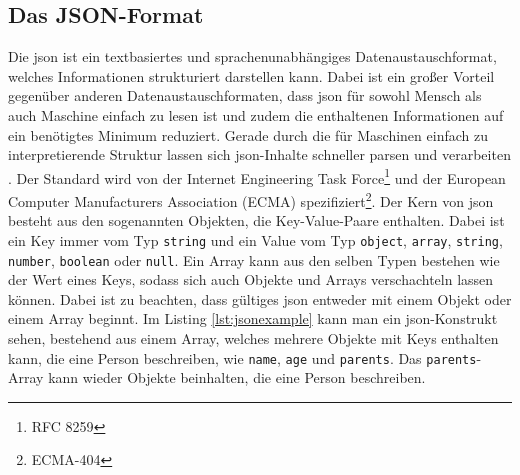 \subsection{Das JSON-Format}
Die \ac{json} ist ein textbasiertes und sprachenunabhängiges Datenaustauschformat, welches Informationen strukturiert darstellen kann.
Dabei ist ein großer Vorteil gegenüber anderen Datenaustauschformaten, dass \ac{json} für sowohl Mensch als auch Maschine einfach zu lesen ist und zudem die enthaltenen Informationen auf ein benötigtes Minimum reduziert.
Gerade durch die für Maschinen einfach zu interpretierende Struktur lassen sich \ac{json}-Inhalte schneller parsen und verarbeiten \parencite{WYS2014}.
Der Standard wird von der Internet Engineering Task Force\footnote{RFC 8259} und der European Computer Manufacturers Association (ECMA) spezifiziert\footnote{ECMA-404}.\pbreak%
%
Der Kern von \ac{json} besteht aus den sogenannten Objekten, die Key-Value-Paare enthalten.
Dabei ist ein Key immer vom Typ \texttt{string} und ein Value vom Typ \texttt{object}, \texttt{array}, \texttt{string}, \texttt{number}, \texttt{boolean} oder \texttt{null}.
Ein Array kann aus den selben Typen bestehen wie der Wert eines Keys, sodass sich auch Objekte und Arrays verschachteln lassen können.
Dabei ist zu beachten, dass gültiges \ac{json} entweder mit einem Objekt oder einem Array beginnt.
Im Listing \ref{lst:jsonexample} kann man ein \ac{json}-Konstrukt sehen, bestehend aus einem Array, welches mehrere Objekte mit Keys enthalten kann, die eine Person beschreiben, wie \texttt{name}, \texttt{age} und \texttt{parents}.
Das \texttt{parents}-Array kann wieder Objekte beinhalten, die eine Person beschreiben.


